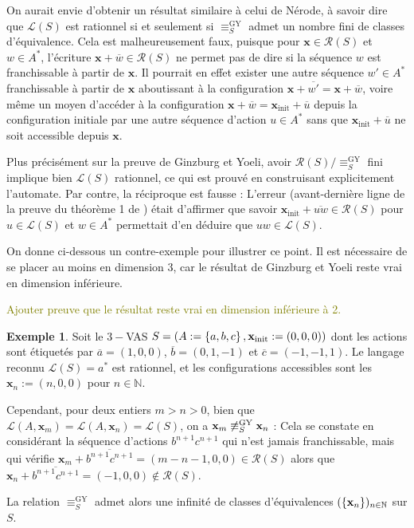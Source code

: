 \documentclass[a4paper,final]{article}
\theoremstyle{definition}
\newtheorem{Example}[Theorem]{Exemple}
\newcommand{\lucas}[1]{\textcolor{olive}{#1}}
\newcommand{\os}[1]{\left\{\mathinner{#1}\right\}}
\newcommand{\N}{\ensuremath{\mathbb{N}}}
\newcommand{\lang}{\ensuremath{\mathcal{L}}}
\newcommand{\conf}{\ensuremath{\mathcal{R}}}
\newcommand{\vect}[1]{\ensuremath{\mathbf{#1}}}
\newcommand{\relGY}{\ensuremath{\equiv^\text{GY}_S}}
\newcommand{\xinit}{\ensuremath{\vect{x}_\text{init}}}
\newcommand{\valeur}[1]{\ensuremath{\overline{#1}}}
\begin{document}
On aurait envie d'obtenir un résultat similaire à celui de Nérode, à savoir dire que $\lang(S)$ est rationnel si et seulement si $\relGY$ admet un nombre fini de classes d'équivalence.
Cela est malheureusement faux, puisque pour $\vect{x}\in\conf(S)$ et $w\in A^\ast$, l'écriture $\vect{x} +\valeur{w}\in\conf(S)$ ne permet pas de dire si la séquence $w$ est franchissable à partir de $\vect{x}$.
Il pourrait en effet exister une autre séquence $w'\in A^\ast$ franchissable à partir de $\vect{x}$ aboutissant à la configuration $\vect{x} +\valeur{w'} = \vect{x} +\valeur{w}$,
voire même un moyen d'accéder à la configuration $\vect{x} +\valeur{w} = \xinit +\valeur{u}$ depuis la configuration initiale par une autre séquence d'action $u\in A^\ast$ sans que $\xinit +\valeur{u}$ ne soit accessible depuis $\vect{x}$.

Plus précisément sur la preuve de Ginzburg et Yoeli, 
avoir $\conf(S)/\relGY$ fini implique bien $\lang(S)$ rationnel, ce qui est prouvé en construisant explicitement l'automate.
Par contre, la réciproque est fausse : 
L'erreur (avant-dernière ligne de la preuve du théorème 1 de \cite{giyo80}) était d'affirmer que savoir $\xinit +\valeur{uw}\in\conf(S)$ pour $u\in\lang(S)$ et $w\in A^\ast$ permettait d'en déduire que $uw\in\lang(S)$.

\vspace{5mm}

On donne ci-dessous un contre-exemple pour illustrer ce point.
Il est nécessaire de se placer au moins en dimension 3, car le résultat de Ginzburg et Yoeli reste vrai en dimension inférieure.

\lucas{Ajouter preuve que le résultat reste vrai en dimension inférieure à 2.}

\begin{Example}
Soit le $3-$VAS $S = (A:=\os{a,b,c},\xinit:=(0,0,0))$ dont les actions sont étiquetés par $\valeur{a}=(1,0,0)$, $\valeur{b}=(0,1,-1)$ et $\valeur{c}=(-1,-1,1)$.
Le langage reconnu $\lang(S)=a^\ast$ est rationnel, et les configurations accessibles sont les $\vect{x}_n:=(n,0,0)$ pour $n\in\N$.

Cependant, pour deux entiers $m>n>0$, bien que $\lang(A,\vect{x}_m) =\lang(A,\vect{x}_n) =\lang(S)$, on a $\vect{x}_m \not\relGY \vect{x}_n$ :
Cela se constate en considérant la séquence d'actions $b^{n+1}c^{n+1}$ qui n'est jamais franchissable, mais qui vérifie $\vect{x}_m +\valeur{b^{n+1}c^{n+1}} = (m-n-1,0,0)\in \conf(S)$ alors que $\vect{x}_n +\valeur{b^{n+1}c^{n+1}} = (-1,0,0)\notin \conf(S)$.

La relation $\relGY$ admet alors une infinité de classes d'équivalences $(\os{\vect{x}_n})_{n\in\N}$ sur $S$.
\end{Example}
\end{document}
